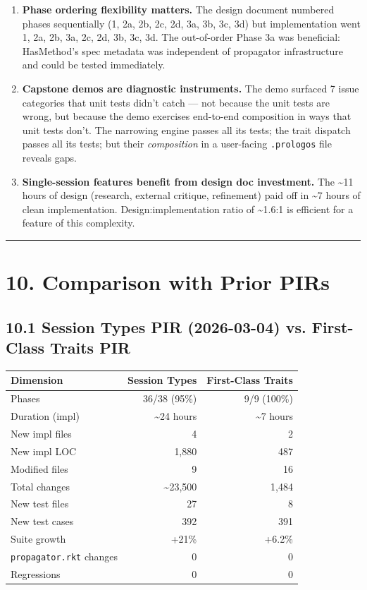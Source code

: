 \documentclass[11pt]{article}
\begin{document}
\begin{enumerate}
\item \textbf{Phase ordering flexibility matters.} The design document numbered phases
sequentially (1, 2a, 2b, 2c, 2d, 3a, 3b, 3c, 3d) but implementation went
1, 2a, 2b, 3a, 2c, 2d, 3b, 3c, 3d. The out-of-order Phase 3a was beneficial:
HasMethod's spec metadata was independent of propagator infrastructure and could
be tested immediately.

\item \textbf{Capstone demos are diagnostic instruments.} The demo surfaced 7 issue categories
that unit tests didn't catch — not because the unit tests are wrong, but because
the demo exercises end-to-end composition in ways that unit tests don't.
The narrowing engine passes all its tests; the trait dispatch passes all its tests;
but their \emph{composition} in a user-facing \texttt{.prologos} file reveals gaps.

\item \textbf{Single-session features benefit from design doc investment.} The \textasciitilde{}11 hours of
design (research, external critique, refinement) paid off in \textasciitilde{}7 hours of clean
implementation. Design:implementation ratio of \textasciitilde{}1.6:1 is efficient for a feature
of this complexity.
\end{enumerate}

\noindent\rule{\textwidth}{0.5pt}
\section{10. Comparison with Prior PIRs}
\label{sec:org0628357}

\subsection{10.1 Session Types PIR (2026-03-04) vs. First-Class Traits PIR}
\label{sec:org90ba8f3}

\begin{center}
\begin{tabular}{lrr}
Dimension & Session Types & First-Class Traits\\
\hline
Phases & 36/38 (95\%) & 9/9 (100\%)\\
Duration (impl) & \textasciitilde{}24 hours & \textasciitilde{}7 hours\\
New impl files & 4 & 2\\
New impl LOC & 1,880 & 487\\
Modified files & 9 & 16\\
Total changes & \textasciitilde{}23,500 & 1,484\\
New test files & 27 & 8\\
New test cases & 392 & 391\\
Suite growth & +21\% & +6.2\%\\
\texttt{propagator.rkt} changes & 0 & 0\\
Regressions & 0 & 0\\
\end{tabular}
\end{center}
\end{document}
